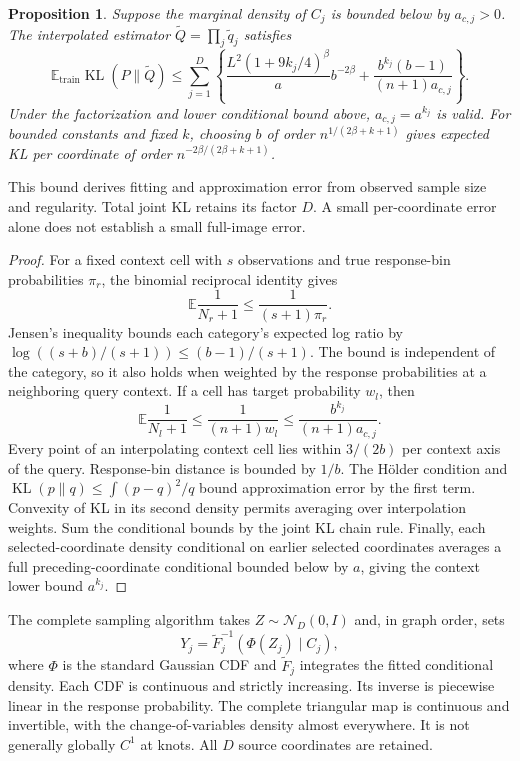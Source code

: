 \documentclass[11pt]{article}
\newtheorem{proposition}{Proposition}
\newcommand{\E}{\mathbb E}
\begin{document}
\begin{proposition}
Suppose the marginal density of $C_j$ is bounded below by $a_{c,j}>0$. The interpolated estimator $\widetilde Q=\prod_j\widetilde q_j$ satisfies
\begin{equation}
 \E_{\mathrm{train}}\operatorname{KL}(P\|\widetilde Q)
 \leq \sum_{j=1}^D\left\{
 \frac{L^2(1+9k_j/4)^\beta}{a}b^{-2\beta}
 +\frac{b^{k_j}(b-1)}{(n+1)a_{c,j}}\right\}.
\end{equation}
Under the factorization and lower conditional bound above, $a_{c,j}=a^{k_j}$ is valid. For bounded constants and fixed $k$, choosing $b$ of order $n^{1/(2\beta+k+1)}$ gives expected KL per coordinate of order $n^{-2\beta/(2\beta+k+1)}$.
\end{proposition}
This bound derives fitting and approximation error from observed sample size and regularity. Total joint KL retains its factor $D$. A small per-coordinate error alone does not establish a small full-image error.

\begin{proof}
For a fixed context cell with $s$ observations and true response-bin probabilities $\pi_r$, the binomial reciprocal identity gives
\begin{equation}
 \E\frac1{N_r+1}\leq\frac1{(s+1)\pi_r}.
\end{equation}
Jensen's inequality bounds each category's expected log ratio by
$\log((s+b)/(s+1))\leq(b-1)/(s+1)$. The bound is independent of the category, so it also holds when weighted by the response probabilities at a neighboring query context. If a cell has target probability $w_l$, then
\begin{equation}
 \E\frac1{N_l+1}\leq\frac1{(n+1)w_l}
 \leq\frac{b^{k_j}}{(n+1)a_{c,j}}.
\end{equation}
Every point of an interpolating context cell lies within $3/(2b)$ per context axis of the query. Response-bin distance is bounded by $1/b$. The H\"older condition and $\operatorname{KL}(p\|q)\leq\int(p-q)^2/q$ bound approximation error by the first term. Convexity of KL in its second density permits averaging over interpolation weights. Sum the conditional bounds by the joint KL chain rule. Finally, each selected-coordinate density conditional on earlier selected coordinates averages a full preceding-coordinate conditional bounded below by $a$, giving the context lower bound $a^{k_j}$.
\end{proof}

The complete sampling algorithm takes $Z\sim\mathcal N_D(0,I)$ and, in graph order, sets
\begin{equation}
 Y_j=\widetilde F_j^{-1}(\Phi(Z_j)\mid C_j),
\end{equation}
where $\Phi$ is the standard Gaussian CDF and $\widetilde F_j$ integrates the fitted conditional density. Each CDF is continuous and strictly increasing. Its inverse is piecewise linear in the response probability. The complete triangular map is continuous and invertible, with the change-of-variables density almost everywhere. It is not generally globally $C^1$ at knots. All $D$ source coordinates are retained.
\end{document}

